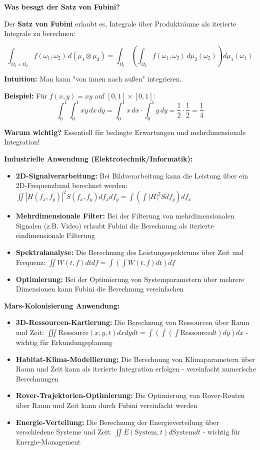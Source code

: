 \begin{denoobification}
\textbf{Was besagt der Satz von Fubini?}

Der \textbf{Satz von Fubini} erlaubt es, Integrale über Produkträume als iterierte Integrale zu berechnen:

\[
\int_{\Omega_1 \times \Omega_2} f(\omega_1, \omega_2) \, d(\mu_1 \otimes \mu_2) = \int_{\Omega_1} \left(\int_{\Omega_2} f(\omega_1, \omega_2) \, d\mu_2(\omega_2)\right) d\mu_1(\omega_1)
\]

\textbf{Intuition:} Man kann "von innen nach außen" integrieren.

\textbf{Beispiel:} Für $f(x,y) = xy$ auf $[0,1] \times [0,1]$:
\[
\int_0^1 \int_0^1 xy \, dx \, dy = \int_0^1 x \, dx \cdot \int_0^1 y \, dy = \frac{1}{2} \cdot \frac{1}{2} = \frac{1}{4}
\]

\textbf{Warum wichtig?} Essentiell für bedingte Erwartungen und mehrdimensionale Integration!

\textbf{Industrielle Anwendung (Elektrotechnik/Informatik):}
\begin{itemize}
    \item \textbf{2D-Signalverarbeitung:} Bei Bildverarbeitung kann die Leistung über ein 2D-Frequenzband berechnet werden: $\iint |H(f_x, f_y)|^2 S(f_x, f_y) df_x df_y = \int \left(\int |H|^2 S df_y\right) df_x$
    \item \textbf{Mehrdimensionale Filter:} Bei der Filterung von mehrdimensionalen Signalen (z.B. Video) erlaubt Fubini die Berechnung als iterierte eindimensionale Filterung
    \item \textbf{Spektralanalyse:} Die Berechnung des Leistungsspektrums über Zeit und Frequenz: $\iint W(t,f) dt df = \int \left(\int W(t,f) dt\right) df$
    \item \textbf{Optimierung:} Bei der Optimierung von Systemparametern über mehrere Dimensionen kann Fubini die Berechnung vereinfachen
\end{itemize}

\textbf{Mars-Kolonisierung Anwendung:}
\begin{itemize}
    \item \textbf{3D-Ressourcen-Kartierung:} Die Berechnung von Ressourcen über Raum und Zeit: $\iiint \text{Ressource}(x,y,t) dx dy dt = \int \left(\int \left(\int \text{Ressource} dt\right) dy\right) dx$ - wichtig für Erkundungsplanung
    \item \textbf{Habitat-Klima-Modellierung:} Die Berechnung von Klimaparametern über Raum und Zeit kann als iterierte Integration erfolgen - vereinfacht numerische Berechnungen
    \item \textbf{Rover-Trajektorien-Optimierung:} Die Optimierung von Rover-Routen über Raum und Zeit kann durch Fubini vereinfacht werden
    \item \textbf{Energie-Verteilung:} Die Berechnung der Energieverteilung über verschiedene Systeme und Zeit: $\iint E(\text{System}, t) d\text{System} dt$ - wichtig für Energie-Management
\end{itemize}


\end{denoobification}
